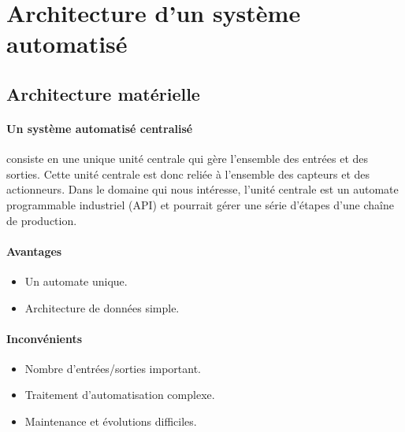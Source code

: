 \section{Architecture d'un système automatisé}
\label{sec:architecture}
\subsection{Architecture matérielle}
\label{subsec:architecture_materielle}
\paragraph{Un système automatisé centralisé} consiste en une unique unité centrale qui gère l'ensemble des entrées et des sorties. Cette unité centrale est donc reliée à l'ensemble des capteurs et des actionneurs.
Dans le domaine qui nous intéresse, l'unité centrale est un automate programmable industriel (API) et pourrait gérer une série d'étapes d'une chaîne de production.

\begin{minipage}{0.45\linewidth}
    \paragraph{Avantages}
    \begin{itemize}
        \item Un automate unique.
        \item Architecture de données simple.
    \end{itemize}
\end{minipage}%
%
\begin{minipage}{0.45\linewidth}
    \paragraph{Inconvénients}
    \begin{itemize}
        \item Nombre d'entrées/sorties important.
        \item Traitement d'automatisation complexe.
        \item Maintenance et évolutions difficiles.
    \end{itemize}
\end{minipage}


\begin{UPSTIactivite}
    \vspace{4cm}
\end{UPSTIactivite}


